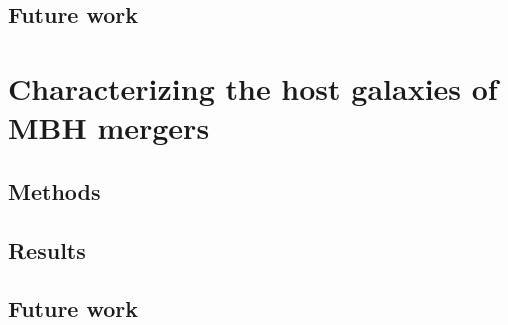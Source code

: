 \documentclass[11pt, letterpaper]{article}
\begin{document}
\subsection{Future work}

\section{Characterizing the host galaxies of MBH mergers}

\subsection{Methods}

\subsection{Results}

\subsection{Future work}



% 

{}


\newpage

% 
\end{document}
